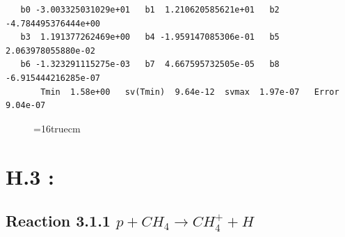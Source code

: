 \documentclass[12pt,dvipdfmx]{article}
\begin{document}
\begin{small}\begin{verbatim}
   b0 -3.003325031029e+01   b1  1.210620585621e+01   b2 -4.784495376444e+00
   b3  1.191377262469e+00   b4 -1.959147085306e-01   b5  2.063978055880e-02
   b6 -1.323291115275e-03   b7  4.667595732505e-05   b8 -6.915444216285e-07
       Tmin  1.58e+00   sv(Tmin)  9.64e-12  svmax  1.97e-07   Error  9.04e-07
\end{verbatim}\end{small}

\begin{figure} \label{met.2_2.23}
\epsfxsize=16truecm
\end{figure}
\newpage




\section{H.3 :}



\subsection{
Reaction 3.1.1    $p + CH_4 \rightarrow CH_4^+ + H $
}
\end{document}
